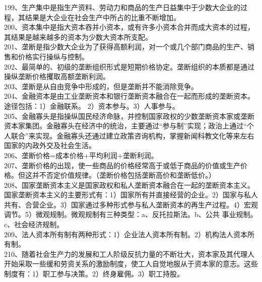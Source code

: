 \documentclass[a4paper,fleqn]{article}
\begin{document}
199、生产集中是指生产资料、劳动力和商品的生产日益集中于少数大企业的过程，其结果是大企业在社会生产中所占的比重不断增加。 \\
200、资本集中是指大资本吞并小资本，或有许多小资本合并而成大资本的过程，其结果是越来越多的资本为少数大资本所支配。 \\
201、垄断是指少数大企业为了获得高额利润，对一个或几个部门商品的生产、销售和价格实行操纵与控制。\\
202、最简单的、初级的垄断组织形式是短期价格协定。垄断组织的本质都是通过操纵垄断价格攫取高额垄断利润。 \\
203、垄断是从自由竞争中形成的，但是垄断并不能消除竞争。 \\
204、金融资本是由工业垄断资本和银行垄断资本融合在一起而形成的垄断资本。途径包括：1）金融联系。 2）资本参与。3）人事参与。 \\
205、金融寡头是指操纵国民经济命脉，并控制国家政权的少数垄断资本家或垄断资本家集团。金融寡头在经济中的统治，主要通过“参与制”实现；政治上通过“个人联合”来实现。金融寡头还通过建立政策咨询机构，掌握新闻科教文化等来左右国家的内政外交及社会生活。 \\
206、垄断价格=成本价格+平均利润+垄断利润。 \\
207、垄断价格的出现，使一些商品的价格经常高于或低于商品的价值或生产价格。但这并不否定价值规律。（垄断价格包括垄断高价和垄断低价。） \\
208、国家垄断资本主义是国家政权和私人垄断资本融合在一起的垄断资本主义。国家垄断资本主义的主要形式有：1）国家所有并直接经营的企业。2）国家与私人共有、合营企业。3）国家通过多种形式参与私人垄断资本的再生产过程。4）宏观调节。5）微观规制。微观规制有三种类型：a、反托拉斯法。b、公共 事业规制。c、社会经济规制。 \\
209、法人资本所有制有两种形式：1）企业法人资本所有制。2）机构法人资本所有制。 \\
210、随着社会生产力的发展和工人阶级反抗力量的不断壮大，资本家及其代理人开始采取一些缓和劳资关系的激励制度，使工人自觉地服从于资本家的意志。这些制度有：1）职工参与决策。2）终身雇佣。3）职工持股。\\
\end{document}
